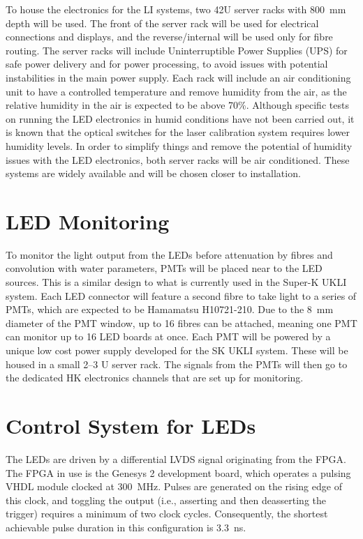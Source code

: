 \documentclass[a4paper,11pt]{article}
\begin{document}
To house the electronics for the LI systems, two 42U server racks with 800~mm depth will be used. The front of the server rack will be used for electrical connections and displays, and the reverse/internal will be used only for fibre routing. The server racks will include Uninterruptible Power Supplies (UPS) for safe power delivery and for power processing, to avoid issues with potential instabilities in the main power supply. Each rack will include an air conditioning unit to have a controlled temperature and remove humidity from the air, as the relative humidity in the air is expected to be above 70\%. Although specific tests on running the LED electronics in humid conditions have not been carried out, it is known that the optical switches for the laser calibration system requires lower humidity levels. In order to simplify things and remove the potential of humidity issues with the LED electronics,  both server racks will be air conditioned. These systems are widely available and will be chosen closer to installation.

\section{LED Monitoring}

To monitor the light output from the LEDs before attenuation by fibres and convolution with water parameters, PMTs will be placed near to the LED sources. This is a similar design to what is currently used in the Super-K UKLI system. Each LED connector will feature a second fibre to take light to a series of PMTs, which are expected to be Hamamatsu H10721-210. Due to the 8~mm diameter of the PMT window, up to 16 fibres can be attached, meaning one PMT can monitor up to 16 LED boards at once. Each PMT will be powered by a unique low cost power supply developed for the SK UKLI system. These will be housed in a small 2--3 U server rack. The signals from the PMTs will then go to the dedicated HK electronics channels that are set up for monitoring.

\section{Control System for LEDs}\label{sec:LEDcontrol}

The LEDs are driven by a differential LVDS signal originating from the FPGA. The FPGA in use is the Genesys 2 \cite{Genesys2} development board, which operates a pulsing VHDL module clocked at \SI{300}{\mega\hertz}. Pulses are generated on the rising edge of this clock, and toggling the output (i.e., asserting and then deasserting the trigger) requires a minimum of two clock cycles. Consequently, the shortest achievable pulse duration in this configuration is 3.3~ns.
\end{document}
